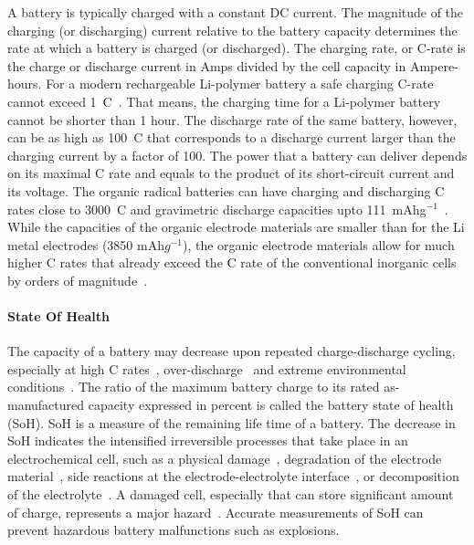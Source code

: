 A battery is typically charged with a constant DC current. The magnitude of the charging (or discharging) current relative to the battery capacity determines the rate at which a battery is charged (or discharged). The charging rate, or C-rate is the charge or discharge current in Amps divided by the cell capacity in Ampere-hours. For a modern rechargeable Li-polymer battery a safe charging C-rate cannot exceed 1~C~\cite{Zhang2022}. That means, the charging time for a Li-polymer battery cannot be shorter than 1 hour. The discharge rate of the same battery, however, can be as high as 100~C that corresponds to a discharge current larger than the charging current by a factor of 100. The power that a battery can deliver depends on its maximal C rate and equals to the product of its short-circuit current and its voltage. The organic radical batteries can have charging and discharging C rates close to 3000~C and gravimetric discharge capacities upto 111~mAhg$^{-1}$~\cite{Vereshchagin2020,friebe2017_topcurrchem,Zens2022,Vereshchagin2022,Kulikov2023,Tarascon2001}. While the capacities of the organic electrode materials are smaller than for the Li metal electrodes (3850 mAh$g^{-1}$), the organic electrode materials allow for much higher C rates that already exceed the C rate of the conventional inorganic cells by orders of magnitude~\cite{Diouf2019}.

\paragraph{State Of Health}
The capacity of a battery may decrease upon repeated charge-discharge cycling, especially at high C rates~\cite{Guan2018,Ouyang2020}, over-discharge~\cite{Ma2020} and extreme environmental conditions~\cite{Zhang2022}. The ratio of the maximum battery charge to its rated as-manufactured capacity expressed in percent is called the battery state of health (SoH). SoH is a measure of the remaining life time of a battery. The decrease in SoH indicates the intensified irreversible processes that take place in an electrochemical cell, such as a physical damage~\cite{Fu_2015}, degradation of the electrode material~\cite{Ma2020,Kulikov2022}, side reactions at the electrode-electrolyte interface~\cite{Tarascon2001}, or decomposition of the electrolyte~\cite{Fang_2021}. A damaged cell, especially that can store significant amount of charge, represents a major hazard~\cite{Ma2020}. Accurate measurements of SoH can prevent hazardous battery malfunctions such as explosions.

